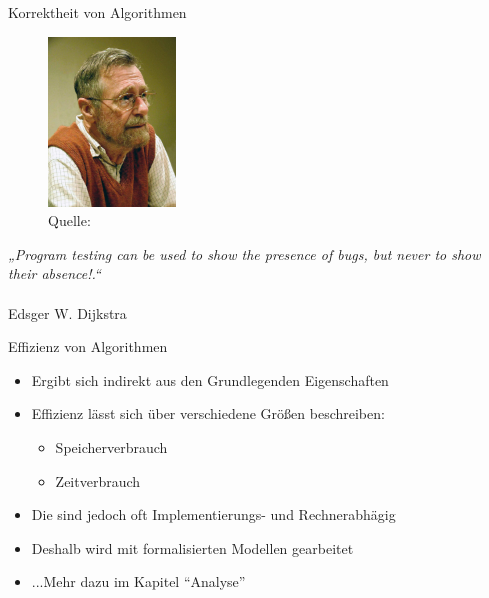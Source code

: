 \begin{frame}{Korrektheit von Algorithmen}{}
\begin{minipage}{0.4\textwidth}
            \begin{figure}
                \includegraphics[height=4.5cm]{graph/dijkstra}
                \caption*{Quelle: }%
            \end{figure}
        \end{minipage}
        \hfill
        \begin{minipage}{0.55\textwidth}
            \textit{„Program testing can be used to show the presence of bugs, but never to show their absence!.“} \\\\Edsger W. Dijkstra
        \end{minipage}
\end{frame}

\begin{frame}{Effizienz von Algorithmen}{}
    \begin{itemize}
        \item Ergibt sich indirekt aus den Grundlegenden Eigenschaften
        \item Effizienz lässt sich über verschiedene Größen beschreiben:
        \begin{itemize}
            \item Speicherverbrauch
            \item Zeitverbrauch
        \end{itemize}
        \item Die sind jedoch oft Implementierungs- und Rechnerabhägig
        \item Deshalb wird mit formalisierten Modellen gearbeitet
        \item ...Mehr dazu im Kapitel "`Analyse"'
    \end{itemize}
\end{frame}


